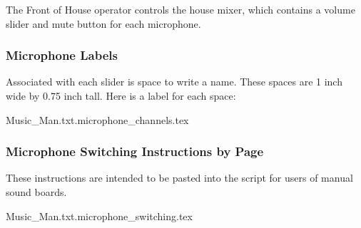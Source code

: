 \documentclass[letterpaper]{article}
\begin{document}
The Front of House operator controls the house mixer, 
which contains a volume slider
and mute button for each microphone.  

\subsubsection {Microphone Labels}

Associated with each slider is space to write a name.  
These spaces are 1 inch wide by 0.75 inch tall.  
Here is a label for each space:

{\Large
 {Music_Man.txt.microphone_channels.tex}
}

\subsubsection {Microphone Switching Instructions by Page}

These instructions are intended to be pasted into the script
for users of manual sound boards.

 {Music_Man.txt.microphone_switching.tex}
\end{document}
